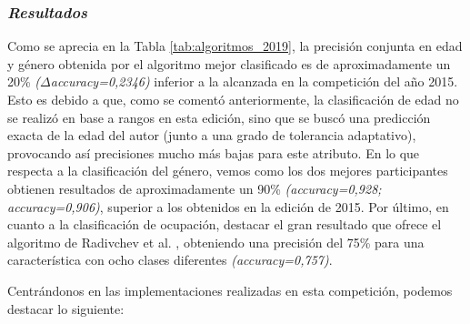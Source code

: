 \subsubsection{\textit{Resultados}}

Como se aprecia en la Tabla \ref{tab:algoritmos_2019}, la precisión conjunta en edad y género obtenida por el algoritmo mejor
clasificado es de aproximadamente un 20\% \textit{($\Delta$accuracy=0,2346)} inferior a la alcanzada en la competición del año 2015. Esto es debido a que,
como se comentó anteriormente, la clasificación de edad no se realizó en base a rangos en esta edición, sino que se
buscó una predicción exacta de la edad del autor (junto a una grado de tolerancia adaptativo), provocando así precisiones mucho
más bajas para este atributo. En lo que respecta a la clasificación del género, vemos como los dos
mejores participantes obtienen resultados de aproximadamente un 90\% \textit{(accuracy=0,928; accuracy=0,906)}, superior a los obtenidos en la edición de 2015.
Por último, en cuanto a la clasificación de ocupación, destacar el gran resultado que ofrece el algoritmo de Radivchev et al. \cite{radivchev2019celebrity},
obteniendo una precisión del 75\% para una característica con ocho clases diferentes \textit{(accuracy=0,757)}.

\bigskip
Centrándonos en las implementaciones realizadas en esta competición, podemos destacar lo siguiente:

